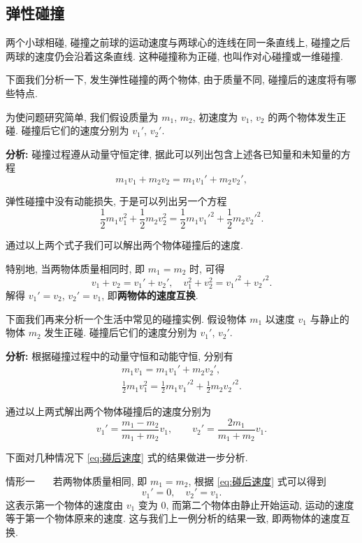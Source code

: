 \documentclass[UTF8,openany,fontset=fandol]{ctexbook}
\theoremstyle{chinesetextbook}
\newcommand{\bre}{\ \ \ }
\begin{document}
\subsection{弹性碰撞}
两个小球相碰, 碰撞之前球的运动速度与两球心的连线在同一条直线上, 碰撞之后两球的速度仍会沿着这条直线. 这种碰撞称为正碰, 也叫作对心碰撞或一维碰撞.

下面我们分析一下, 发生弹性碰撞的两个物体, 由于质量不同, 碰撞后的速度将有哪些特点.

为使问题研究简单, 我们假设质量为 $m_1$, $m_2$, 初速度为 $v_1$, $v_2$ 的两个物体发生正碰. 碰撞后它们的速度分别为 $v_1'$, $v_2'$.

\par\indent\textbf{分析:} 碰撞过程遵从动量守恒定律, 据此可以列出包含上述各已知量和未知量的方程
\[
m_1v_1+m_2v_2=m_1v_1'+m_2v_2',
\]

弹性碰撞中没有动能损失, 于是可以列出另一个方程
\[
\frac12 m_1 v_1^2+\frac12 m_2 v_2^2=\frac12 m_1 v_1'^2+\frac12 m_2 v_2'^2.
\]

通过以上两个式子我们可以解出两个物体碰撞后的速度.

特别地, 当两物体质量相同时, 即 $m_1=m_2$ 时, 可得
\[
v_1+v_2=v_1'+v_2',\quad v_1^2+v_2^2=v_1'^2+v_2'^2.
\]
解得 $v_1'=v_2$, $v_2'=v_1$, 即\textbf{两物体的速度互换}.
\bigskip

下面我们再来分析一个生活中常见的碰撞实例. 假设物体 $m_1$ 以速度 $v_1$ 与静止的物体 $m_2$ 发生正碰. 碰撞后它们的速度分别为 $v_1'$, $v_2'$.

\par\indent\textbf{分析:} 根据碰撞过程中的动量守恒和动能守恒, 分别有
\[
\begin{gathered}
m_1v_1=m_1v_1'+m_2v_2',\\
\frac12 m_1 v_1^2=\frac12 m_1 v_1'^2+\frac12 m_2 v_2'^2.
\end{gathered}
\]

通过以上两式解出两个物体碰撞后的速度分别为
\begin{equation}\label{eq:碰后速度}
v_1'=\frac{m_1-m_2}{m_1+m_2}v_1,\qquad v_2'=\frac{2m_1}{m_1+m_2}v_1.
\end{equation}

下面对几种情况下 \eqref{eq:碰后速度} 式的结果做进一步分析.

{\kaishu 情形一} \bre 若两物体质量相同, 即 $m_1=m_2$, 根据 \eqref{eq:碰后速度} 式可以得到
\[
v_1'=0,\quad v_2'=v_1.
\]
这表示第一个物体的速度由 $v_1$ 变为 0, 而第二个物体由静止开始运动, 运动的速度等于第一个物体原来的速度. 这与我们上一例分析的结果一致, 即两物体的速度互换.
\end{document}
